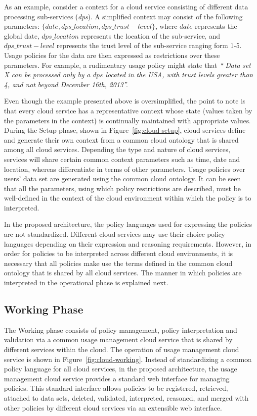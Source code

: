 \documentclass[10pt, conference, compsocconf]{IEEEtran}
\begin{document}
As an example, consider a context for a cloud service consisting of  different data processing sub-services ({\em dps}). A simplified context may consist of the following parameters: $\{date, dps\_location, dps\_trust-level \}$, where $date$ represents the global date, $dps\_location$ represents the location of the sub-service, and $dps\_trust-level$ represents the trust level of the sub-service ranging form 1-5. Usage policies for the data are then expressed as restrictions over these parameters. For example, a rudimentary usage policy might state that {\em `` Data set X can be processed only by a $dps$ located in the USA, with trust levels greater than 4, and not beyond December 16th, 2013''. }

Even though the example presented above is oversimplified, the point to note is that every cloud service has a representative context whose state (values taken by the parameters in the context) is continually maintained with appropriate values. During the Setup phase, shown in Figure~\ref{fig:cloud-setup}, cloud services define and generate their own context from a common cloud ontology that is shared among all cloud services. Depending the type and nature of cloud services, services will share certain common context parameters such as time, date and location, whereas differentiate in terms of other parameters. Usage policies over users' data set are generated using the common cloud ontology. It can be seen that all the parameters, using which policy restrictions are described, must be well-defined in the context of the cloud environment within which the policy is to interpreted.

In the proposed architecture, the policy languages used for expressing the policies are not standardized. Different cloud services may use their choice policy languages depending on their expression and reasoning requirements. However, in order for policies to be interpreted across different cloud environments, it is necessary that all policies make use the terms defined in the common cloud ontology that is shared by all cloud services. The manner in which policies are interpreted in the operational phase is explained next. 



\subsection{Working Phase}
The Working phase consists of policy management, policy interpretation and validation via a common usage management cloud service that is shared by different services within the cloud. The operation of usage management cloud service is shown in Figure~\ref{fig:cloud-working}. Instead of standardizing a common policy language for all cloud services, in the proposed architecture, the usage management cloud service provides a standard web interface for managing policies. This standard interface allows policies to be registered, retrieved, attached to data sets, deleted, validated, interpreted, reasoned, and merged with other policies by different cloud services via an extensible web interface. 
\end{document}
